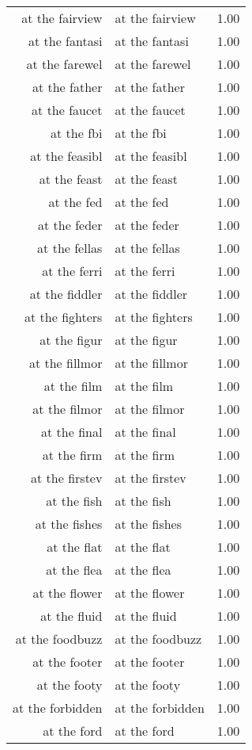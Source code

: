 \begin{table}[ht]
\begin{tabular}{rlr}
  at the fairview & at the fairview & 1.00 \\ 
  at the fantasi & at the fantasi & 1.00 \\ 
  at the farewel & at the farewel & 1.00 \\ 
  at the father & at the father & 1.00 \\ 
  at the faucet & at the faucet & 1.00 \\ 
  at the fbi & at the fbi & 1.00 \\ 
  at the feasibl & at the feasibl & 1.00 \\ 
  at the feast & at the feast & 1.00 \\ 
  at the fed & at the fed & 1.00 \\ 
  at the feder & at the feder & 1.00 \\ 
  at the fellas & at the fellas & 1.00 \\ 
  at the ferri & at the ferri & 1.00 \\ 
  at the fiddler & at the fiddler & 1.00 \\ 
  at the fighters & at the fighters & 1.00 \\ 
  at the figur & at the figur & 1.00 \\ 
  at the fillmor & at the fillmor & 1.00 \\ 
  at the film & at the film & 1.00 \\ 
  at the filmor & at the filmor & 1.00 \\ 
  at the final & at the final & 1.00 \\ 
  at the firm & at the firm & 1.00 \\ 
  at the firstev & at the firstev & 1.00 \\ 
  at the fish & at the fish & 1.00 \\ 
  at the fishes & at the fishes & 1.00 \\ 
  at the flat & at the flat & 1.00 \\ 
  at the flea & at the flea & 1.00 \\ 
  at the flower & at the flower & 1.00 \\ 
  at the fluid & at the fluid & 1.00 \\ 
  at the foodbuzz & at the foodbuzz & 1.00 \\ 
  at the footer & at the footer & 1.00 \\ 
  at the footy & at the footy & 1.00 \\ 
  at the forbidden & at the forbidden & 1.00 \\ 
  at the ford & at the ford & 1.00 \\ 

\end{tabular}
\end{table}
